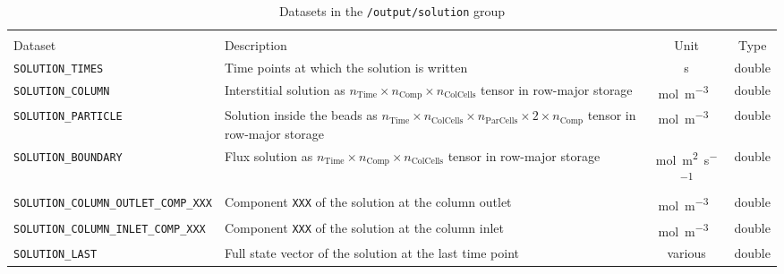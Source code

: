 \begin{table}[!ht]
\footnotesize
\begin{tabu}to \linewidth[m]{lX[m]cc} \toprule
{} \\
\rowfont[c]\normalfont Dataset & Description & Unit & Type \everyrow{\midrule}\\      
\texttt{SOLUTION\_TIMES} & Time points at which the solution is written & \si{\second} & double \\
\texttt{SOLUTION\_COLUMN} & Interstitial solution as $n_{\text{Time}} \times n_{\text{Comp}} \times n_{\text{ColCells}}$ tensor in row-major storage & \si{\mol\per\cubic\metre{}} & double \\
\texttt{SOLUTION\_PARTICLE} & Solution inside the beads as $n_{\text{Time}} \times n_{\text{ColCells}} \times n_{\text{ParCells}} \times 2 \times n_{\text{Comp}}$ tensor in row-major storage & \si{\mol\per\cubic\metre{}} & double \\
\texttt{SOLUTION\_BOUNDARY} & Flux solution as $n_{\text{Time}} \times n_{\text{Comp}} \times n_{\text{ColCells}}$ tensor in row-major storage & \si{\mol\per\square\metre\per\second} & double \\
\texttt{SOLUTION\_COLUMN\_OUTLET\_COMP\_XXX} & Component \texttt{XXX} of the solution at the column outlet & \si{\mol\per\cubic\metre{}} & double \\
\texttt{SOLUTION\_COLUMN\_INLET\_COMP\_XXX} & Component \texttt{XXX} of the solution at the column inlet & \si{\mol\per\cubic\metre{}} & double \\
\texttt{SOLUTION\_LAST} & Full state vector of the solution at the last time point & various & double 
\everyrow{}\\
\bottomrule
\end{tabu}
\caption{\label{tab:FFOutputSolution}Datasets in the \texttt{/output/solution} group}
\end{table}


